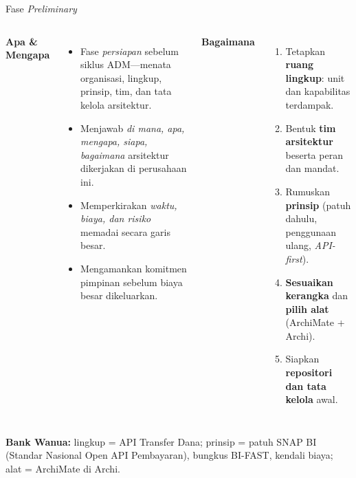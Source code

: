 \documentclass[aspectratio=169, table]{beamer}
\newcommand{\takeaway}[1]{%
  \vspace{4pt}
  {\footnotesize #1}
}
\begin{document}
\begin{frame}{Fase \emph{Preliminary}}
  \vspace{2pt}
  \footnotesize
  \begin{columns}[t]
    \textbf{Apa \& Mengapa}
    \begin{itemize}\setlength{\itemsep}{2.5pt}
      \item Fase \emph{persiapan} sebelum siklus ADM---menata organisasi,
            lingkup, prinsip, tim, dan tata kelola arsitektur.
      \item Menjawab \emph{di mana, apa, mengapa, siapa, bagaimana} arsitektur
            dikerjakan di perusahaan ini.
      \item Memperkirakan \emph{waktu, biaya, dan risiko} memadai secara garis besar.
      \item Mengamankan komitmen pimpinan sebelum biaya besar dikeluarkan.
    \end{itemize}

    \textbf{Bagaimana}
    \begin{enumerate}\setlength{\itemsep}{2.5pt}
      \item Tetapkan \textbf{ruang lingkup}: unit dan kapabilitas terdampak.
      \item Bentuk \textbf{tim arsitektur} beserta peran dan mandat.
      \item Rumuskan \textbf{prinsip} (patuh dahulu, penggunaan ulang,
            \emph{API-first}).
      \item \textbf{Sesuaikan kerangka} dan \textbf{pilih alat} (ArchiMate +
            Archi).
      \item Siapkan \textbf{repositori dan tata kelola} awal.
    \end{enumerate}
  \end{columns}
  \vspace{2pt}
  \takeaway{\textbf{Bank Wanua:} lingkup = API Transfer Dana; prinsip = patuh
  SNAP BI (Standar Nasional Open API Pembayaran), bungkus BI-FAST, kendali
  biaya; alat = ArchiMate di Archi.}
\end{frame}
\end{document}
